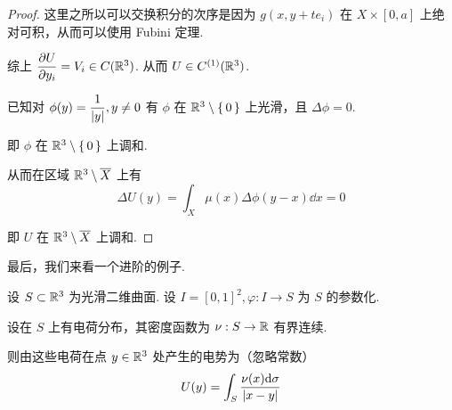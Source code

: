 \begin{proof}
    这里之所以可以交换积分的次序是因为 $g(x,y+te_i)$ 在 $X\times[0,a]$ 上绝对可积，从而可以使用 Fubini 定理.

    综上 $\dfrac{\partial U}{\partial y_i}=V_i\in C(\mathbb{R}^3)$. 从而 $U\in C^{(1)}(\mathbb{R}^3)$.

    已知对 $\phi(y)=\dfrac{1}{\left\lvert{y}\right\rvert},y\ne 0$ 有 $\phi$ 在 $\mathbb{R}^3\setminus\set{0}$ 上光滑，且 $\Delta\phi=0$.

    即 $\phi$ 在 $\mathbb{R}^3\setminus\set{0}$ 上调和.

    从而在区域 $\mathbb{R}^3\setminus\overline{X}$ 上有
$$
\Delta U(y)=\int_X\mu(x)\Delta\phi(y-x)\dd x=0
$$

    即 $U$ 在 $\mathbb{R}^3\setminus\overline{X}$ 上调和.
\end{proof}

最后，我们来看一个进阶的例子.

\begin{example}
    设 $S\subset\mathbb{R}^3$ 为光滑二维曲面. 设 $I=[0,1]^2,\varphi:I\to S$ 为 $S$ 的参数化.

    设在 $S$ 上有电荷分布，其密度函数为 $\nu:S\to\mathbb{R}$ 有界连续.

    则由这些电荷在点 $y\in\mathbb{R}^3$ 处产生的电势为（忽略常数）
$$
U(y)=\int_S\frac{\nu(x)\mathrm{d}\sigma}{\left\lvert{x-y}\right\rvert}
$$
\end{example}

